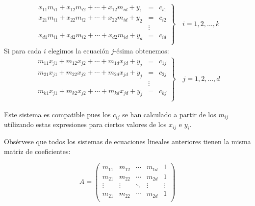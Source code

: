\begin{reader}
    \begin{align*}
        \left.
            \begin{array}{lll}
                x_{11}m_{i1} + x_{12}m_{i2} + \cdots + x_{12}m_{id} + y_1 & = & c_{i1} \\
                x_{21}m_{i1} + x_{22}m_{i2} + \cdots + x_{22}m_{id} + y_2 & = & c_{i2} \\
                                                                        & \vdots &   \\
                x_{d1}m_{i1} + x_{d2}m_{i2} + \cdots + x_{d2}m_{id} + y_d & = & c_{id} \\
            \end{array}
        \right\}\quad i=1,2,\dots,k
    \end{align*}
    Si para cada $i$ elegimos la ecuación $j$-ésima obtenemos:
    \begin{align*}
        \left.
            \begin{array}{lll}
                m_{11}x_{j1} + m_{12}x_{j2} + \cdots + m_{1d}x_{jd} + y_j & = & c_{1j} \\
                m_{21}x_{j1} + m_{22}x_{j2} + \cdots + m_{2d}x_{jd} + y_j & = & c_{2j} \\
                                                                        & \vdots &   \\
                m_{k1}x_{j1} + m_{k2}x_{j2} + \cdots + m_{kd}x_{jd} + y_j & = & c_{kj} \\
            \end{array}
        \right\}\quad j=1,2,\dots,d
    \end{align*}    
\end{reader}
Este sistema es compatible pues los $c_{ij}$ se han calculado a partir de los $m_{ij}$ utilizando estas expresiones para ciertos valores de los $x_{ij}$ e $y_i$. \begin{reader}
    Obsérvese que todos los sistemas de ecuaciones lineales anteriores tienen la misma matriz de coeficientes:
\end{reader}
$$A=\begin{pmatrix}
    m_{11} & m_{12} & \cdots & m_{1d} & 1 \\
    m_{21} & m_{22} & \cdots & m_{2d} & 1 \\
    \vdots & \vdots & \ddots & \vdots & \vdots \\
    m_{21} & m_{22} & \cdots & m_{2d} & 1 \\
\end{pmatrix}$$

